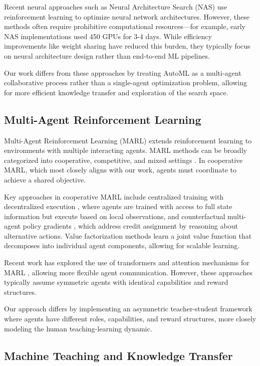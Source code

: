 \documentclass[twoside,11pt]{article}
\begin{document}
Recent neural approaches such as Neural Architecture Search (NAS) \citep{zoph2017neural} use reinforcement learning to optimize neural network architectures. However, these methods often require prohibitive computational resources—for example, early NAS implementations used 450 GPUs for 3-4 days. While efficiency improvements like weight sharing \citep{pham2018} have reduced this burden, they typically focus on neural architecture design rather than end-to-end ML pipelines.

Our work differs from these approaches by treating AutoML as a multi-agent collaborative process rather than a single-agent optimization problem, allowing for more efficient knowledge transfer and exploration of the search space.

\subsection{Multi-Agent Reinforcement Learning}

Multi-Agent Reinforcement Learning (MARL) extends reinforcement learning to environments with multiple interacting agents. MARL methods can be broadly categorized into cooperative, competitive, and mixed settings \citep{hernandez2019survey}. In cooperative MARL, which most closely aligns with our work, agents must coordinate to achieve a shared objective.

Key approaches in cooperative MARL include centralized training with decentralized execution \citep{lowe2017multi}, where agents are trained with access to full state information but execute based on local observations, and counterfactual multi-agent policy gradients \citep{foerster2018counterfactual}, which address credit assignment by reasoning about alternative actions. Value factorization methods \citep{sunehag2018} learn a joint value function that decomposes into individual agent components, allowing for scalable learning.

Recent work has explored the use of transformers and attention mechanisms for MARL \citep{hu2021updet}, allowing more flexible agent communication. However, these approaches typically assume symmetric agents with identical capabilities and reward structures.

Our approach differs by implementing an asymmetric teacher-student framework where agents have different roles, capabilities, and reward structures, more closely modeling the human teaching-learning dynamic.

\subsection{Machine Teaching and Knowledge Transfer}
\end{document}
